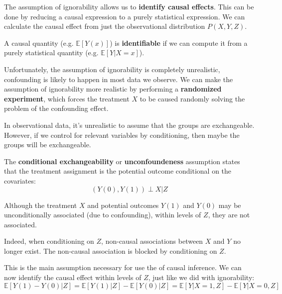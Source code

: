 The assumption of ignorability allows us to \textbf{identify causal effects}. This
can be done by reducing a causal expression to a purely statistical expression. We
can calculate the causal effect from just the observational distribution $P(X, Y, Z)$.

\begin{definition}
    A causal quantity (e.g. $\mathbb{E}[Y(x)]$) is \textbf{identifiable} if we can
    compute it from a purely statistical quantity (e.g. $\mathbb{E}[Y| X = x]$).
\end{definition}

Unfortunately, the assumption of ignorability is completely unrealistic, confounding
is likely to happen in most data we observe. We can make the assumption of ignorability
more realistic by performing a \textbf{randomized experiment}, which forces the
treatment $X$ to be caused randomly solving the problem of the confounding effect.

In observational data, it's unrealistic to assume that the groups are exchangeable.
However, if we control for relevant variables by conditioning, then maybe the groups
will be exchangeable.

\begin{definition}
    The \textbf{conditional exchangeability} or \textbf{unconfoundeness} assumption
    states that the treatment assignment is the potential outcome conditional
    on the covariates:
    \begin{equation}
        (Y(0), Y(1)) \perp X | Z
    \end{equation}
\end{definition}

Although the treatment $X$ and potential outcomes $Y(1)$ and $Y(0)$ may be
unconditionally associated (due to confounding), within levels of $Z$, they are
not associated.

Indeed, when conditioning on $Z$, non-causal associations between $X$ and $Y$ no
longer exist. The non-causal association is blocked by conditioning on $Z$.

This is the main assumption necessary for use the of causal inference. We can now identify
the causal effect within levels of $Z$, just like we did with ignorability:
\begin{equation}
    \mathbb{E}[Y(1) - Y(0) | Z] = \mathbb{E}[Y(1)| Z] - \mathbb{E}[Y(0)| Z] =
    \mathbb{E}[Y|X = 1, Z] - \mathbb{E}[Y|X = 0, Z]
\end{equation}

